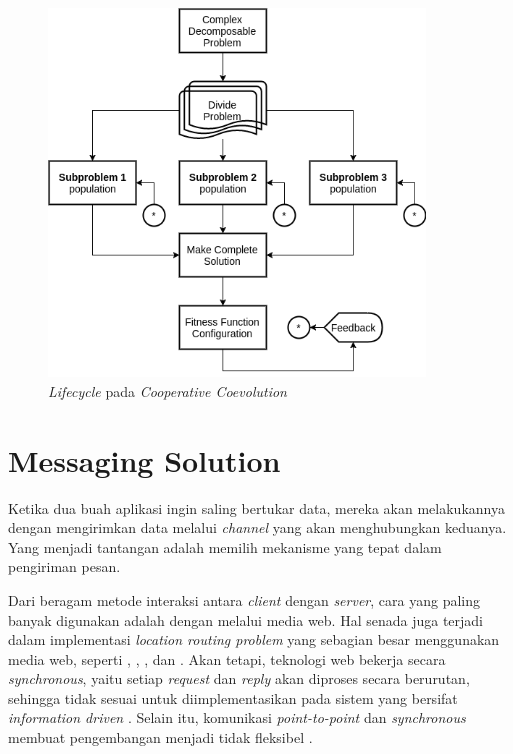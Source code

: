 \begin{figure}[!]
	\centering
	\includegraphics[width=10cm]{Resources/Images/coes_overview}
	\captionsetup{format=hang}
	\caption{\textit{Lifecycle} pada \textit{Cooperative Coevolution} \citep{de_oliveira_cooperative_2016}}
	\label{fig:coes_lifecycle}
\end{figure}


\section{Messaging Solution}
\label{sec:messaging-solution}


Ketika dua buah aplikasi ingin saling bertukar data, mereka akan melakukannya dengan mengirimkan data melalui \textit{channel} yang akan menghubungkan keduanya. Yang menjadi tantangan adalah memilih mekanisme yang tepat dalam pengiriman pesan.


Dari beragam metode interaksi antara \textit{client} dengan \textit{server}, cara yang paling banyak digunakan adalah dengan melalui media web. Hal senada juga terjadi dalam implementasi \textit{location routing problem} yang sebagian besar menggunakan media web, seperti \citep{weise_solving_2009}, \citep{sengoku_fast_1998}, \citep{sarmenta_bayanihan_2002}, dan \citep{diaz_vrp_2012}. Akan tetapi, teknologi web bekerja secara \textit{synchronous}, yaitu setiap \textit{request} dan \textit{reply} akan diproses secara berurutan, sehingga tidak sesuai untuk diimplementasikan pada sistem yang bersifat \textit{information driven} \citep{muhl_large-scale_2002}. Selain itu, komunikasi \textit{point-to-point} dan \textit{synchronous} membuat pengembangan menjadi tidak fleksibel \citep{eugster_many_2003}.


